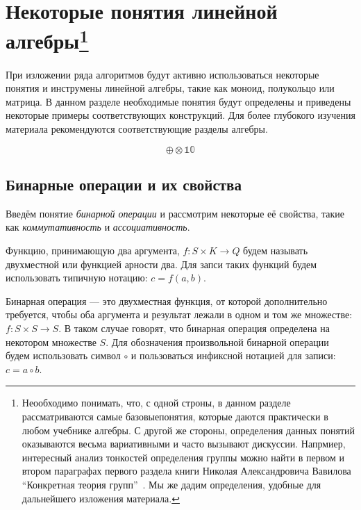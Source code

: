 \chapter[x]{Некоторые понятия линейной алгебры\footnote{Неообходимо понимать, что, с одной строны, в данном разделе рассматриваются самые базовыепонятия, которые даются практически в любом учебнике алгебры. С другой же стороны, определения данных понятий оказываются весьма вариативными и часто вызывают дискуссии. Напрмиер, интересный анализ тонкостей определения группы можно найти в первом и втором параграфах первого раздела книги Николая Александровича Вавилова ``Конкретная теория групп''~\cite{VavilovGroups}. Мы же дадим определения, удобные для дальнейшего изложения материала.}}\label{chpt:LinAlIntro}

При изложении ряда алгоритмов будут активно использоваться некоторые понятия и инструмены линейной алгебры, такие как моноид, полукольцо или матрица.
В данном разделе необходимые понятия будут определены и приведены некоторые примеры соответствующих конструкций. Для более глубокого изучения материала рекомендуются соответствующие разделы алгебры.

$$
\oplus
\otimes
\mathbb{1}
\mathbb{0}
$$

\section{Бинарные операции и их свойства}


Введём понятие \textit{бинарной операции} и рассмотрим некоторые её свойства, такие как \textit{коммутативность} и \textit{ассоциативность}.

\begin{definition} Функцию, принимающую два аргумента, $f: S \times K \to Q$ будем называть двухместной или функцией арности два.
Для запси таких функций будем использовать типичную нотацию: $c = f(a,b)$.
\end{definition}


\begin{definition} 
Бинарная операция --- это двухместная функция, от которой дополнительно требуется, чтобы оба аргумента и результат лежали в одном и том же множестве: $f: S \times S \to S$. В таком случае говорят, что бинарная операция определена на некотором множестве $S$. Для обозначения произвольной бинарной операции будем использовать символ $\circ$ и пользоваться инфиксной нотацией для записи: $c = a \circ b$.
\end{definition}




